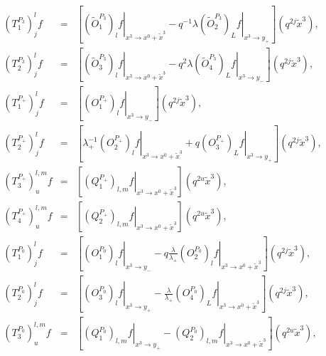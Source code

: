 \documentclass[a4paper,11pt,oneside]{article}
\begin{document}
\begin{eqnarray}
\left(T^{P_3}_1\right)_j^lf&=&
\left[ \left. \left( \tilde{O}%
_{1}^{P_{3}}\right) _{l}f\right| _{x^{3}\rightarrow x^{0}+\tilde{x}%
^{3}}-q^{-1}\lambda \left. \left( \tilde{O}_{2}^{P_{3}}\right) _{L}f\right|
_{x^{3}\rightarrow y_{+}}\right] \left( q^{2j}\tilde{x}^{3}\right),\\
\left(T^{P_3}_2\right)_j^lf&=&
\left[ \left. \left( \tilde{O}_{3}^{P_{3}}\right)
_{l}f\right| _{x^{3}\rightarrow x^{0}+\tilde{x}^{3}}-q^{2}\lambda \left.
\left( \tilde{O}_{4}^{P_{3}}\right) _{L}f\right| _{x^{3}\rightarrow
y_{-}}\right] \left( q^{2j}\tilde{x}^{3}\right),\nonumber\\[0.16in]
\left(T^{P_+}_1\right)_j^lf&=&
\left[ \left. \left( O_{1}^{P_{+}}\right) _{l}f\right| _{x^{3}\rightarrow
y_{-}}\right] \left( q^{2j}\tilde{x}^{3}\right),\\
\left(T^{P_+}_2\right)_j^lf&=&
\left[ \lambda _{+}^{-1}\left. \left( O_{2}^{P_{+}}\right)
_{l}f\right| _{x^{3}\rightarrow x^{0}+\tilde{x}^{3}} 
+ q\left. \left(
O_{3}^{P_{+}}\right) _{L}f\right| _{x^{3}\rightarrow y_{+}}\right] \left(
q^{2j}\tilde{x}^{3}\right),\nonumber\\
\left(T^{P_+}_3\right)^{l,m}_uf&=&
\left[ \left. \left( Q_{1}^{P_{+}}\right)
_{l,m}f\right| _{x^{3}\rightarrow x^{0}+\tilde{x}^{3}}\right] \left( q^{2u}%
\tilde{x}^{3}\right),\nonumber\\
\left(T^{P_+}_4\right)^{l,m}_uf&=&
\left[ \left. \left( Q_{2}^{P_{+}}\right)
_{l,m}f\right| _{x^{3}\rightarrow x^{0}+\tilde{x}^{3}}\right] \left( q^{2u}%
\tilde{x}^{3}\right),\nonumber\\[0.16in]
\left(T^{P_0}_1\right)_j^lf&=&
\left[ \left. \left( O_{1}^{P_{0}}\right)
_{l}f\right| _{x^{3}\rightarrow y_{-}}-q\frac{\lambda }{\lambda _{+}}\left.
\left( O_{2}^{P_{0}}\right) _{l}f\right| _{x^{3}\rightarrow x^{0}+\tilde{x}%
^{3}}\right] \left( q^{2j}\tilde{x}^{3}\right),\\
\left(T^{P_0}_2\right)^l_jf&=&
\left[ \left. \left( O_{3}^{P_{0}}\right) _{l}f\right|
_{x^{3}\rightarrow y_{+}}-\frac{\lambda }{\lambda _{+}}\left. \left(
O_{4}^{P_{0}}\right) _{L}f\right| _{x^{3}\rightarrow x^{0}+\tilde{x}%
^{3}}\right] \left( q^{2j}\tilde{x}^{3}\right),\nonumber\\
\left(T^{P_0}_3\right)^{l,m}_uf&=&
 \left[ \left. \left( Q_{1}^{P_{0}}\right)
_{l,m}f\right| _{x^{3}\rightarrow y_{+}}-\left. \left( Q_{2}^{P_{0}}\right)
_{l,m}f\right| _{x^{3}\rightarrow x^{0}+\tilde{x}^{3}}\right] \left( q^{2u}%
\tilde{x}^{3}\right),\nonumber\\

\end{eqnarray}
\end{document}
